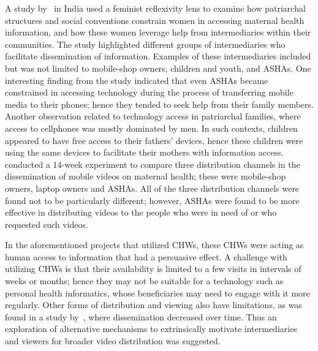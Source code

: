 A study by~\cite{kumar2015mobile} in India used a feminist reflexivity lens to examine how patriarchal structures and social conventions constrain women in accessing maternal health information, and how these women leverage help from intermediaries within their communities. The study highlighted different groups of intermediaries who facilitate dissemination of information. Examples of these intermediaries included but was not limited to mobile-shop owners, children and youth, and ASHAs. One interesting finding from the study indicated that even ASHAs became constrained in accessing technology during the process of transferring mobile media to their phones; hence they tended to seek help from their family members. Another observation related to technology access in patriarchal families, where access to cellphones was mostly dominated by men. In such contexts, children appeared to have free access to their fathers' devices, hence these children were using the same devices to facilitate their mothers with information access.~\cite{vashistha2016mobile} conducted a 14-week experiment to compare three distribution channels in the dissemination of mobile videos on maternal health; these were mobile-shop owners, laptop owners and ASHAs. All of the three distribution channels were found not to be particularly different; however, ASHAs were found to be more effective in distributing videos to the people who were in need of or who requested such videos.

In the aforementioned projects that utilized CHWs, these CHWs were acting as human access to information that had a persuasive effect. A challenge with utilizing CHWs is that their availability is limited to a few visits in intervals of weeks or months; hence they may not be suitable for a technology such as personal health informatics, whose beneficiaries may need to engage with it more regularly. Other forms of distribution and viewing also have limitations, as was found in a study by~\cite{vashistha2016mobile}, where dissemination decreased over time. Thus an exploration of alternative mechanisms  to extrinsically motivate intermediaries and viewers for broader video distribution was suggested.


